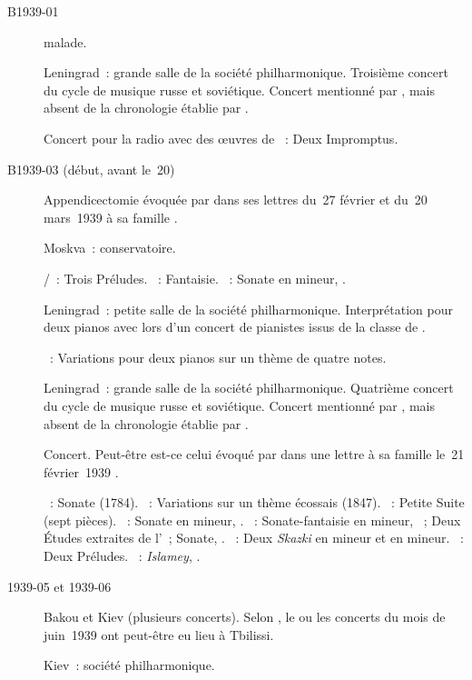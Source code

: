 \begin{description}
 \item[B1939-01]
 \VSofronitsky{} malade.
 \item[]
 Leningrad~: grande salle de la société philharmonique.
 Troisième concert du cycle de musique russe et soviétique.
 Concert mentionné par \citet[p.~160]{Nekrasova08}, mais absent de la
 chronologie établie par \citet[p.~413]{Scriabine}.
 \item[]
 Concert pour la radio avec des œuvres de \Scriabine{}~: Deux Impromptus.
 \item[B1939-03 (début, avant le~20)]
 Appendicectomie évoquée par \VSofronitsky{} dans ses lettres du~27 février
 et du~20 mars~1939 à sa famille \citep[p.~26]{Kogan08}.
 \item[]
 Moskva~: conservatoire.

 \textsc{\JBach{}/\Busoni{}}~: Trois Préludes.
 \textsc{\Mozart{}}~: Fantaisie.
 \textsc{\Chopin{}}~: Sonate en \kB \Flat mineur, .
 \item[]
 Leningrad~: petite salle de la société philharmonique.
 Interprétation pour deux pianos avec \DChostakovitch{} lors d'un concert de
 pianistes issus de la classe de \LNikolaiev{}.

 \textsc{\Nikolaiev{}}~: Variations pour deux pianos sur un thème de quatre
 notes.
 \item[]
 Leningrad~: grande salle de la société philharmonique.
 Quatrième concert du cycle de musique russe et soviétique.
 Concert mentionné par \citet[p.~160]{Nekrasova08}, mais absent de la
 chronologie établie par \citet[p.~413]{Scriabine}.
 \item[]
 Concert.
 Peut-être est-ce celui évoqué par \VSofronitsky{} dans une lettre à sa
 famille le~21 février~1939 \citep[p.~26]{Kogan08}.

 \textsc{\Bortnianski{}}~: Sonate (1784).
 \textsc{\Glinka{}}~: Variations sur un thème écossais (1847).
 \textsc{\Borodine{}}~: Petite Suite (sept pièces).
 \textsc{\Glazounov{}}~: Sonate en \kB \Flat mineur, .
 \textsc{\Scriabine{}}~: Sonate-fantaisie en \kG \Sharp mineur, ~;
 Deux Études extraites de l'~; Sonate, .
 \textsc{\Medtner{}}~: Deux \emph{Skazki} en \kB mineur et en \kE mineur.
 \textsc{\Rachmaninov{}}~: Deux Préludes.
 \textsc{\Balakirev{}}~: \emph{Islamey}, .
 \item[1939-05 et 1939-06]
 Bakou et Kiev (plusieurs concerts).
 Selon \citet[p.~414]{Scriabine}, le ou les concerts du mois de juin~1939
 ont peut-être eu lieu à Tbilissi.
 \item[]
 Kiev~: société philharmonique.


\end{description}
